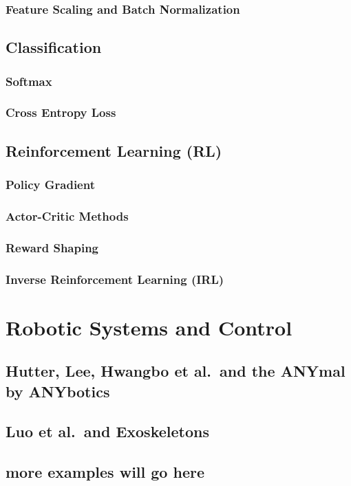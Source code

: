 \documentclass[12pt]{report}
\theoremstyle{definition}
\theoremstyle{remark}
\begin{document}
\subsection{Feature Scaling and Batch Normalization}

\section{Classification}

\subsection{Softmax}

\subsection{Cross Entropy Loss}

\section{Reinforcement Learning (RL)}

\subsection{Policy Gradient}

\subsection{Actor-Critic Methods}

\subsection{Reward Shaping}

\subsection{Inverse Reinforcement Learning (IRL)}

\chapter{Robotic Systems and Control}

\section{Hutter, Lee, Hwangbo et al.\ and the ANYmal by ANYbotics}

\cite{hutter_legged_2022}

\section{Luo et al.\ and Exoskeletons}

\section{more examples will go here}

\printglossaries

\printbibliography
{}
\end{document}
